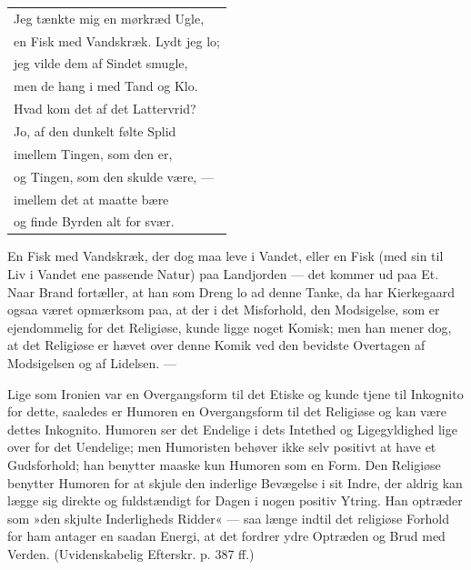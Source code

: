 \documentclass[12pt,a4paper,openany]{book}
\newcommand{\opage}[1]{\marginnote{\footnotesize\textit{[#1]}}}
\begin{document}
\begin{center}\small\begin{tabular}{@{}l@{}}
Jeg tænkte mig en mørkræd Ugle,\\
en Fisk med Vandskræk. Lydt jeg lo;\\
jeg vilde dem af Sindet smugle,\\
men de hang i med Tand og Klo.\\
Hvad kom det af det Lattervrid?\\
Jo, af den dunkelt følte Splid\\
imellem Tingen, som den er,\\
og Tingen, som den skulde være, ---\\
imellem det at maatte bære\\
og finde Byrden alt for svær.
\end{tabular}\end{center}

En Fisk med Vandskræk, der dog maa leve i Vandet,
eller en Fisk (med sin til Liv i Vandet ene passende
Natur) paa Landjorden --- det kommer ud paa Et. Naar
Brand fortæller, at han som Dreng lo ad denne Tanke,
da har Kierkegaard ogsaa været opmærksom paa, at der
i det Misforhold, den Modsigelse, som er ejendommelig
for det Religiøse, kunde ligge noget Komisk; men han
mener dog, at det Religiøse er hævet over denne Komik
ved den bevidste Overtagen af Modsigelsen og af Lidelsen.
---

Lige som Ironien var en Overgangsform til det
Etiske og kunde tjene til Inkognito for dette, saaledes
er Humoren en Overgangsform til det Religiøse og
kan være dettes Inkognito. Humoren ser det Endelige
i dets Intethed og Ligegyldighed lige over for det Uendelige;
men Humoristen behøver ikke selv positivt at have
et Gudsforhold; han benytter maaske kun Humoren som
en Form. Den Religiøse benytter Humoren for at skjule
den inderlige Bevægelse i sit Indre, der aldrig kan lægge
sig direkte og fuldstændigt for Dagen i nogen positiv
\opage{114}Ytring. Han optræder som »den skjulte Inderligheds
Ridder« --- saa længe indtil det religiøse Forhold for
ham antager en saadan Energi, at det fordrer ydre Optræden
og Brud med Verden. (Uvidenskabelig Efterskr.
p. 387 ff.)
\end{document}
